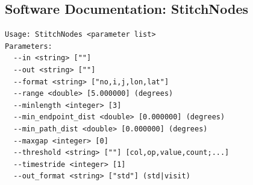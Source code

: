 \documentclass[gmdd, hvmath, online]{copernicus_discussions}
\begin{document}
\subsection{Software Documentation: StitchNodes} \label{sec:StitchNodesAppendix}

\begin{verbatim}
Usage: StitchNodes <parameter list>
Parameters:
  --in <string> [""] 
  --out <string> [""] 
  --format <string> ["no,i,j,lon,lat"] 
  --range <double> [5.000000] (degrees)
  --minlength <integer> [3] 
  --min_endpoint_dist <double> [0.000000] (degrees)
  --min_path_dist <double> [0.000000] (degrees)
  --maxgap <integer> [0] 
  --threshold <string> [""] [col,op,value,count;...]
  --timestride <integer> [1] 
  --out_format <string> ["std"] (std|visit)
\end{verbatim}
\end{document}
